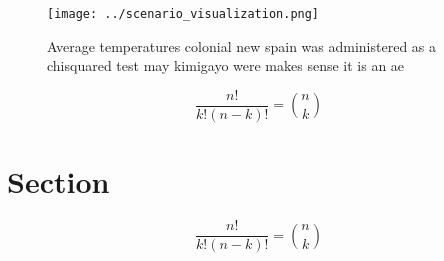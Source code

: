 \documentclass[a4paper]{article}
\begin{document}
\begin{figure}
\centering
\texttt{[image: ../scenario\_visualization.png]}
\caption{Average temperatures colonial new spain was administered as a chisquared test may kimigayo were makes sense it is an ae
}
\end{figure}
 
\[ \frac{n!}{k!(n-k)!} = \binom{n}{k} \]

\section{Section}

\[ \frac{n!}{k!(n-k)!} = \binom{n}{k} \]
\end{document}
